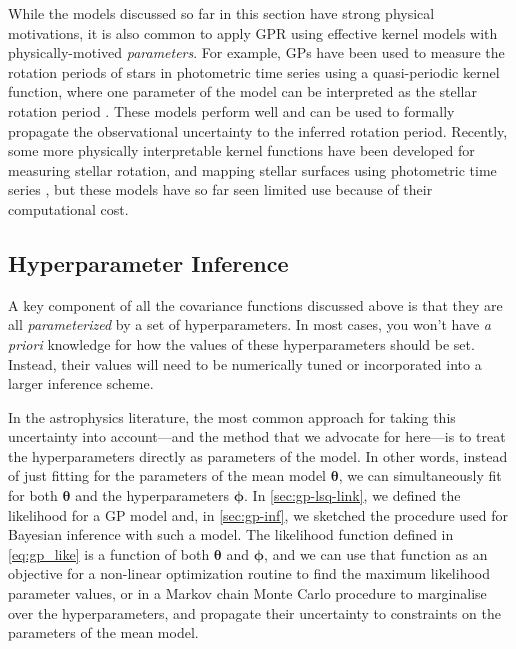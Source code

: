 \documentclass[letterpaper]{ar-1col}
\newcommand{\suz}[1]{\textcolor{magenta}{#1}}
\newcommand{\hyperparams}{\ensuremath{\boldsymbol{\phi}}}
\newcommand{\meanparams}{\ensuremath{\boldsymbol{\theta}}}
\begin{document}
While the models discussed so far in this section have strong physical motivations, it is also common to apply GPR using effective kernel models with physically-motived \emph{parameters}.
For example, GPs have been used to measure the rotation periods of stars in photometric time series using a quasi-periodic kernel function, where one parameter of the model can be interpreted as the stellar rotation period \citep{2018MNRAS.474.2094A}.
These models perform well and can be used to formally propagate the observational uncertainty to the inferred rotation period.
Recently, some more physically interpretable kernel functions have been developed for measuring stellar rotation, and mapping stellar surfaces using photometric time series \citep{2021AJ....162..124L}, but these models have so far seen limited use because of their computational cost.


\subsection{Hyperparameter Inference}\label{sec:inference}

A key component of all the covariance functions discussed above is that they are all \emph{parameterized} by a set of hyperparameters.
In most cases, you won't have \emph{a priori} knowledge for how the values of these hyperparameters should be set.
Instead, their values will need to be numerically tuned or incorporated into a larger inference scheme.

In the astrophysics literature, the most common approach for taking this uncertainty into account---and the method that we advocate for here---is to treat the hyperparameters directly as parameters of the model.
In other words, instead of just fitting for the parameters of the mean model $\meanparams$, we can simultaneously fit for both $\meanparams$ and the hyperparameters $\hyperparams$.
In \autoref{sec:gp-lsq-link}, we defined the likelihood for a GP model and, in \autoref{sec:gp-inf}, we sketched the procedure used for Bayesian inference with such a model.
The likelihood function defined in \autoref{eq:gp_like} is a function of both $\meanparams$ and $\hyperparams$, and we can use that function as an objective for a non-linear optimization routine to find the maximum likelihood parameter values, or in a Markov chain Monte Carlo \citep[MCMC; e.g.][]{2018ApJS..236...11H} procedure to marginalise over the hyperparameters, and propagate their uncertainty to constraints on the parameters of the mean model.
\end{document}
